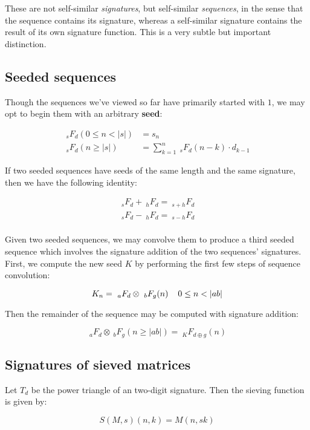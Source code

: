 \documentclass{article}
\begin{document}
\noindent These are not self-similar \textit{signatures}, but self-similar \textit{sequences}, in the sense that the sequence contains its signature, whereas a self-similar signature contains the result of its own signature function. This is a very subtle but important distinction.

\subsection{Seeded sequences}

\noindent Though the sequences we've viewed so far have primarily started with $1$, we may opt to begin them with an arbitrary \textbf{seed}:

\begin{align*}
~_s F_d (0 \leq n < |s|) &= s_n\\
~_s F_d (n \geq |s|) &= \sum_{k=1}^{n}  ~_s F_d (n-k) \cdot d_{k-1}
\end{align*}

\noindent If two seeded sequences have seeds of the same length and the same signature, then we have the following identity:

\begin{align*}
~_s F_d + ~_h F_d = ~_{s + h} F_d\\
~_s F_d - ~_h F_d = ~_{s - h} F_d\\
\end{align*}

\noindent Given two seeded sequences, we may convolve them to produce a third seeded sequence which involves the signature addition of the two sequences' signatures. First, we compute the new seed $K$ by performing the first few steps of sequence convolution:

$$K_n = ~_a F_d \otimes ~_b F_g (n) \hspace{4mm} 0 \leq n < |ab|$$

\noindent Then the remainder of the sequence may be computed with signature addition:

$$~_a F_d \otimes ~_b F_g (n \geq |ab|) = ~_K F_{d \oplus g}(n)$$

\subsection{Signatures of sieved matrices}

Let $T_d$ be the power triangle of an two-digit signature. Then the sieving function is given by:

$$S(M, s)(n, k) = M(n, sk)$$
\end{document}
